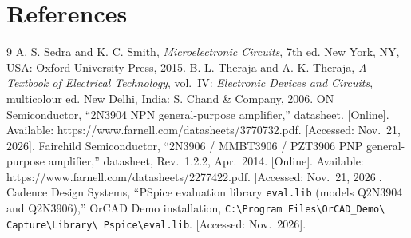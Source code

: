 \documentclass[12pt,a4paper]{article}
\begin{document}
	\section{References}
	\renewcommand{\refname}{} %
	\sloppy
	\begin{thebibliography}{9}
		 A. S. Sedra and K. C. Smith,
		\textit{Microelectronic Circuits}, 7th ed. New York, NY, USA:
		Oxford University Press, 2015.
		 B. L. Theraja and A. K. Theraja,
		\textit{A Textbook of Electrical Technology}, vol.~IV:
		\textit{Electronic Devices and Circuits}, multicolour ed. New Delhi,
		India: S. Chand \& Company, 2006.
		 ON Semiconductor, ``2N3904 NPN general-purpose
		amplifier,'' datasheet. [Online]. Available:
		https://www.farnell.com/datasheets/3770732.pdf. [Accessed:
		Nov.~21, 2026].
		 Fairchild Semiconductor, ``2N3906 / MMBT3906 /
		PZT3906 PNP general-purpose amplifier,'' datasheet, Rev.~1.2.2,
		Apr.~2014. [Online]. Available:
		https://www.farnell.com/datasheets/2277422.pdf. [Accessed:
		Nov.~21, 2026].
		 Cadence Design Systems, ``PSpice evaluation
		library \texttt{eval.lib} (models Q2N3904 and Q2N3906),'' OrCAD
		Demo installation, \texttt{C:\textbackslash\allowbreak Program
			Files\textbackslash\allowbreak OrCAD\_Demo\textbackslash\allowbreak
			Capture\textbackslash\allowbreak Library\textbackslash\allowbreak
			Pspice\textbackslash\allowbreak eval.lib}. [Accessed: Nov.~2026].
	\end{thebibliography}
\end{document}
